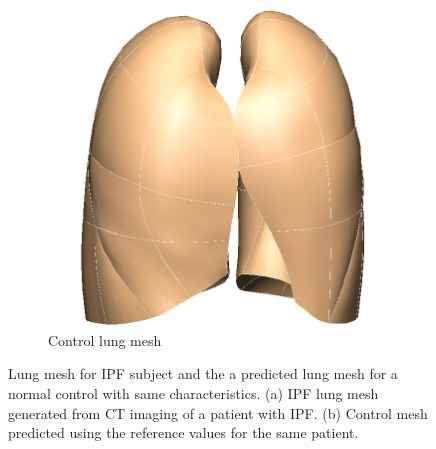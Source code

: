 \begin{figure}[htbp]
\begin{subfigure}{.4\linewidth}
  \includegraphics[width=\linewidth,trim={{.0\wd0} {.0\wd0} {.0\wd0} {.0\wd0}},clip]{ModelBasedAnalysis/Image/IPF405_NormalLungMesh.png}
  \caption{Control lung mesh}
  \label{fig:LungShapePrediction-b} 
\end{subfigure}
\caption{Lung mesh for IPF subject and the a predicted lung mesh for a normal control with same characteristics. (a) IPF lung mesh generated from CT imaging of a patient with IPF. (b) Control mesh predicted using the reference values for the same patient.}
\label{fig:LungShapePrediction}
\end{figure}


